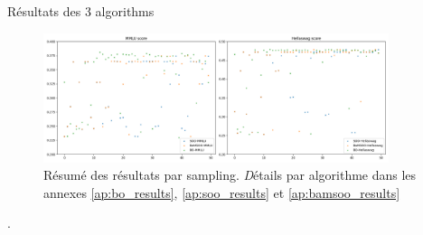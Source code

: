 \begin{frame}{Résultats des 3 algorithms}
    \begin{figure}
        \centering
        \includegraphics[width = 0.9\textwidth]{assets/imgs/plots/global/comparison.png}
        \caption{Résumé des résultats par sampling. {\footnotesize \textit Détails par algorithme dans les annexes \ref{ap:bo_results}, \ref{ap:soo_results} et \ref{ap:bamsoo_results}}}
    \end{figure} 
    .
\end{frame}

